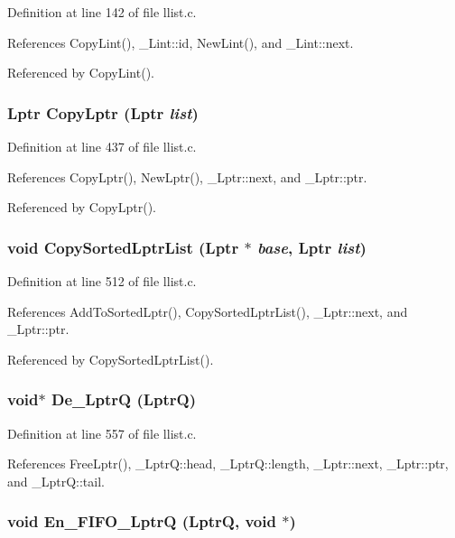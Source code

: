 Definition at line 142 of file llist.c.

References Copy\-Lint(), \_\-Lint::id, New\-Lint(), and \_\-Lint::next.

Referenced by Copy\-Lint().
\subsubsection{\setlength{\rightskip}{0pt plus 5cm}\bf{Lptr} Copy\-Lptr (\bf{Lptr} {\em list})}\label{llist_8h_bd2cad04e4f5a6a7f7f8de3d99177a66}




Definition at line 437 of file llist.c.

References Copy\-Lptr(), New\-Lptr(), \_\-Lptr::next, and \_\-Lptr::ptr.

Referenced by Copy\-Lptr().
\subsubsection{\setlength{\rightskip}{0pt plus 5cm}void Copy\-Sorted\-Lptr\-List (\bf{Lptr} $\ast$ {\em base}, \bf{Lptr} {\em list})}\label{llist_8h_b2a3ee93556ce740ce28a0d435870f00}




Definition at line 512 of file llist.c.

References Add\-To\-Sorted\-Lptr(), Copy\-Sorted\-Lptr\-List(), \_\-Lptr::next, and \_\-Lptr::ptr.

Referenced by Copy\-Sorted\-Lptr\-List().
\subsubsection{\setlength{\rightskip}{0pt plus 5cm}void$\ast$ De\_\-Lptr\-Q (\bf{Lptr\-Q})}\label{llist_8h_8320238fb7564a0b677edaf99d37053e}




Definition at line 557 of file llist.c.

References Free\-Lptr(), \_\-Lptr\-Q::head, \_\-Lptr\-Q::length, \_\-Lptr::next, \_\-Lptr::ptr, and \_\-Lptr\-Q::tail.
\subsubsection{\setlength{\rightskip}{0pt plus 5cm}void En\_\-FIFO\_\-Lptr\-Q (\bf{Lptr\-Q}, void $\ast$)}\label{llist_8h_21acfb5fcbc71cf779f08da61399fc51}




